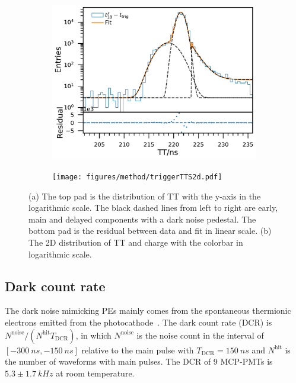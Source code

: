 \begin{figure}[!htbp]
    \centering
    \begin{subfigure}[t]{\SF\textwidth}
        \includegraphics[width=\textwidth]{figures/method/triggerTTSLog.pdf}
        \caption{}%
        \label{fig:triggerTTSLog}
    \end{subfigure}
    \begin{subfigure}[t]{\SF\textwidth}
        \texttt{[image: figures/method/triggerTTS2d.pdf]}
        \caption{}%
        \label{fig:triggerTTS2d}
    \end{subfigure}
    \caption{(a) The top pad is the distribution of TT with the y-axis in the logarithmic scale. The black dashed lines from left to right are early, main and delayed components with a dark noise pedestal. The bottom pad is the residual between data and fit in linear scale. (b) The 2D distribution of TT and charge with the colorbar in logarithmic scale.}
\end{figure}

\subsection{Dark count rate}
\label{sec:dcr}
The dark noise mimicking PEs mainly comes from the spontaneous thermionic electrons emitted from the photocathode~\cite{KM3NetTesting}. The dark count rate (DCR) is ${N^{\mathrm{noise}}}/({N^{\mathrm{hit}}T_{\mathrm{DCR}}})$, in which $N^{\mathrm{noise}}$ is the noise count in the interval of $[\SI{-300}{ns},\SI{-150}{ns}]$ relative to the main pulse with $T_{\mathrm{DCR}}=\SI{150}{ns}$ and $N^{\mathrm{hit}}$ is the number of waveforms with main pulses. The DCR of 9 MCP-PMTs is $5.3\pm\SI{1.7}{kHz}$ at room temperature.

